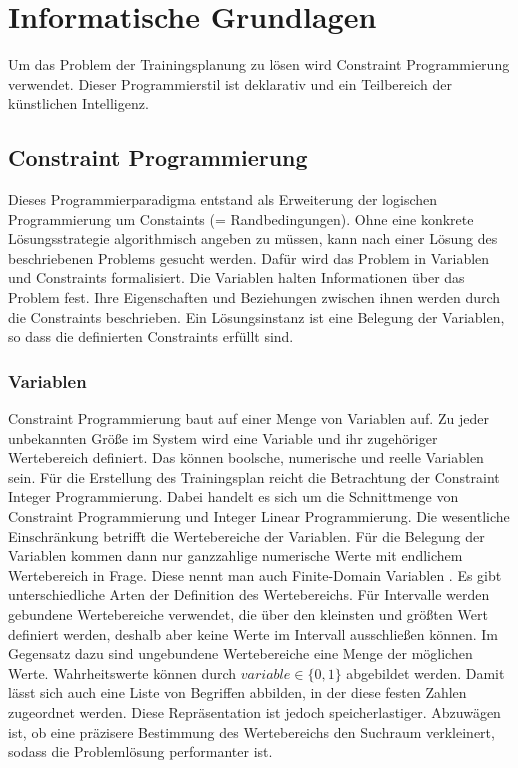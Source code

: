 \chapter{Informatische Grundlagen}
\label{sec:grundlagen:info}
Um das Problem der Trainingsplanung zu lösen wird Constraint Programmierung verwendet. Dieser Programmierstil ist deklarativ und ein Teilbereich der künstlichen Intelligenz.

\section{Constraint Programmierung}
Dieses Programmierparadigma entstand als Erweiterung der logischen Programmierung um Constaints (= Randbedingungen). Ohne eine konkrete Lösungsstrategie algorithmisch angeben zu müssen, kann nach einer Lösung des beschriebenen Problems gesucht werden. Dafür wird das Problem in Variablen und Constraints formalisiert. Die Variablen halten Informationen über das Problem fest. Ihre Eigenschaften und Beziehungen zwischen ihnen werden durch die Constraints beschrieben. Ein Lösungsinstanz ist eine Belegung der Variablen, so dass die definierten Constraints erfüllt sind. \cite{EssentialsConstraintProgrammierung, HandbookConstraintProgramming, HandbookKnowledgeRepresentation}

\subsection{Variablen}
Constraint Programmierung baut auf einer Menge von Variablen auf. Zu jeder unbekannten Größe im System wird eine Variable und ihr zugehöriger Wertebereich definiert. Das können boolsche, numerische und reelle Variablen sein.
Für die Erstellung des Trainingsplan reicht die Betrachtung der Constraint Integer Programmierung. Dabei handelt es sich um die Schnittmenge von Constraint Programmierung und Integer Linear Programmierung. Die wesentliche Einschränkung betrifft die Wertebereiche der Variablen. Für die Belegung der Variablen kommen dann nur ganzzahlige numerische Werte mit endlichem Wertebereich in Frage. Diese nennt man auch Finite-Domain Variablen . Es gibt unterschiedliche Arten der Definition des Wertebereichs. Für Intervalle werden gebundene Wertebereiche verwendet, die über den kleinsten und größten Wert definiert werden, deshalb aber keine Werte im Intervall ausschließen können. Im Gegensatz dazu sind ungebundene Wertebereiche eine Menge der möglichen Werte. Wahrheitswerte können durch $variable \in \{0, 1\}$ abgebildet werden. Damit lässt sich auch eine Liste von Begriffen abbilden, in der diese festen Zahlen zugeordnet werden. Diese Repräsentation ist jedoch speicherlastiger. Abzuwägen ist, ob eine präzisere Bestimmung des Wertebereichs den Suchraum verkleinert, sodass die Problemlösung performanter ist.

